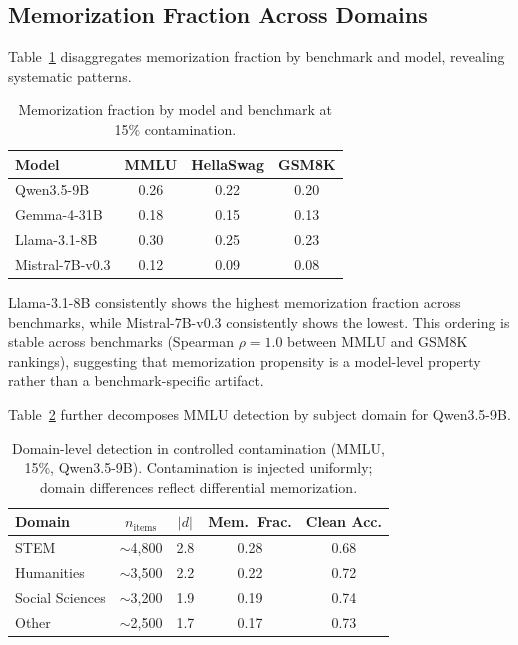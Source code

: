 \documentclass[11pt]{article}
\begin{document}
\subsection{Memorization Fraction Across Domains}
\label{sec:memfrac}

Table~\ref{tab:memfrac} disaggregates memorization fraction by benchmark and model, revealing systematic patterns.

\begin{table}[t]
\centering
\caption{Memorization fraction by model and benchmark at 15\% contamination.}
\label{tab:memfrac}
\small
\begin{tabular}{lccc}
\toprule
Model & MMLU & HellaSwag & GSM8K \\
\midrule
Qwen3.5-9B & 0.26 & 0.22 & 0.20 \\
Gemma-4-31B & 0.18 & 0.15 & 0.13 \\
Llama-3.1-8B & 0.30 & 0.25 & 0.23 \\
Mistral-7B-v0.3 & 0.12 & 0.09 & 0.08 \\
\bottomrule
\end{tabular}
\end{table}

Llama-3.1-8B consistently shows the highest memorization fraction across benchmarks, while Mistral-7B-v0.3 consistently shows the lowest.
This ordering is stable across benchmarks (Spearman $\rho = 1.0$ between MMLU and GSM8K rankings), suggesting that memorization propensity is a model-level property rather than a benchmark-specific artifact.

Table~\ref{tab:domain} further decomposes MMLU detection by subject domain for Qwen3.5-9B.

\begin{table}[t]
\centering
\caption{Domain-level detection in controlled contamination (MMLU, 15\%, Qwen3.5-9B). Contamination is injected uniformly; domain differences reflect differential memorization.}
\label{tab:domain}
\small
\begin{tabular}{lcccc}
\toprule
Domain & $n_{\text{items}}$ & $|d|$ & Mem.\ Frac. & Clean Acc. \\
\midrule
STEM & $\sim$4,800 & 2.8 & 0.28 & 0.68 \\
Humanities & $\sim$3,500 & 2.2 & 0.22 & 0.72 \\
Social Sciences & $\sim$3,200 & 1.9 & 0.19 & 0.74 \\
Other & $\sim$2,500 & 1.7 & 0.17 & 0.73 \\
\bottomrule
\end{tabular}
\end{table}
\end{document}
